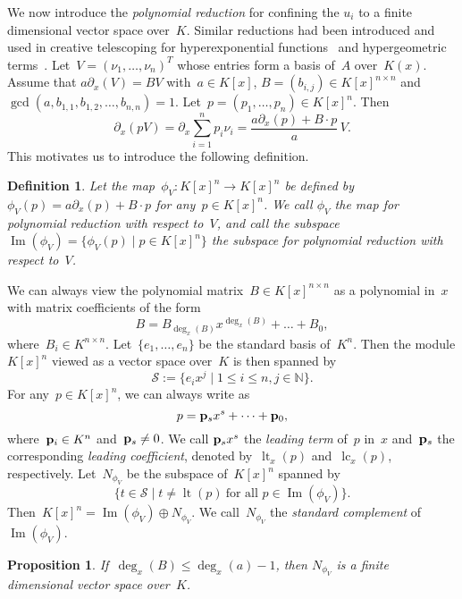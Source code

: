 \documentclass{sig-alternate}
\newtheorem{prop}[theorem]{Proposition}
\newtheorem{defi}[theorem]{Definition}
\newcommand{\bN}{ {\mathbb N}}
\newcommand{\cS}{ {\mathcal S}}
\newcommand{\vp} {{\bf p}}
\def\lc{\operatorname{lc}}
\def\lt{\operatorname{lt}}
\def\im{\operatorname{Im}}
\begin{document}
We now introduce the \emph{polynomial reduction} for confining the $u_i$ to a finite
dimensional vector space over~$K$. Similar reductions had been introduced and used in creative telescoping
for hyperexponential functions~\cite{bostan13a} and hypergeometric terms~\cite{chen15a}.
Let~$V = (\nu_1, \ldots, \nu_n)^T$ whose entries form a basis of~$A$ over~$K(x)$. Assume that
$a \partial_x(V) = BV$ with~$a\in K[x]$, $B = (b_{i, j})\in K[x]^{n \times n}$
and $\gcd(a, b_{1, 1}, b_{1, 2}, \ldots, b_{n ,n})=1$. Let~$p = (p_1, \ldots, p_n)\in K[x]^n$. Then
\begin{equation} \label{EQ:polyred}
\partial_x (p V)=\partial_x \sum_{i=1}^n p_i \nu_i = \frac{a\partial_x(p) + B\cdot p}{a}\, V.
\end{equation}
This motivates us to introduce the following definition.
\begin{defi}\label{DEF:polyred}
Let the map~$\phi_V: K[x]^n \rightarrow K[x]^n$
be defined by~$\phi_V(p) = a \partial_x(p) + B \cdot p$ for any~$p\in K[x]^n$.
We call $\phi_V$ the \emph{map for polynomial reduction} with respect to~$V$, and call
the subspace $\im(\phi_V) = \{\phi_V(p) \mid p \in K[x]^n\}$
the \emph{subspace for polynomial reduction} with respect to~$V$.
\end{defi}
We can always view the polynomial matrix~$B\in K[x]^{n\times n}$ as a polynomial in~$x$
with matrix coefficients of the form
\[B = B_{\deg_x(B)}x^{\deg_x(B)} + \ldots + B_0, \]
where~$B_i\in K^{n\times n}$.
Let~$\{e_1, \ldots, e_n\}$ be the standard basis of~$K^n$. Then the module $K[x]^n$ viewed as a vector space over~$K$
is then spanned by
\[\cS := \{e_ix^j \mid 1\leq i \leq n, j\in \bN\}.\]
For any~$p \in K[x]^n$, we can always write as
\[p = \vp_sx^s + \cdots + \vp_0,\]
where~$\vp_i\in K^n$ and~$\vp_s \neq 0$. We call $\vp_sx^s$
the \emph{leading term} of~$p$ in~$x$ and~$\vp_s$ the corresponding \emph{leading coefficient},
denoted by~$\lt_x(p)$ and~$\lc_x(p)$, respectively.
Let~$N_{\phi_V}$ be the subspace of~$K[x]^n$ spanned by
\[\{t \in \cS \mid t \neq \lt(p) ~\text{for all~$p\in \im(\phi_V)$}\}.\]
Then~$K[x]^n = \im(\phi_V) \oplus N_{\phi_V}$.
We call~$N_{\phi_V}$ the \emph{standard complement} of~$\im(\phi_V)$.
\begin{prop}\label{PROP:finite}
If~$\deg_x(B) \leq \deg_x(a)-1$, then $N_{\phi_V}$ is a finite dimensional
vector space over~$K$.
\end{prop}
\end{document}
